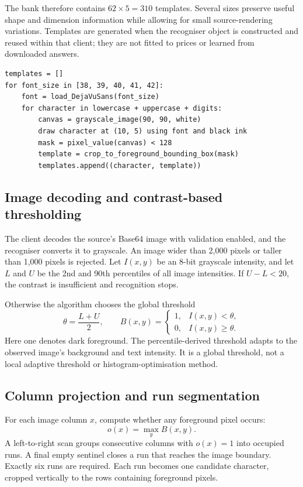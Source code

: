 \documentclass[12pt,a4paper,oneside]{report}
\numberwithin{equation}{chapter}
\numberwithin{figure}{chapter}
\numberwithin{table}{chapter}
\theoremstyle{definition}
\begin{document}
The bank therefore contains $62\times5=310$ templates. Several sizes preserve useful shape and dimension information while allowing for small source-rendering variations. Templates are generated when the recogniser object is constructed and reused within that client; they are not fitted to prices or learned from downloaded answers.

\begin{lstlisting}[caption={Algorithm: generate the CAPTCHA template bank}]
templates = []
for font_size in [38, 39, 40, 41, 42]:
    font = load_DejaVuSans(font_size)
    for character in lowercase + uppercase + digits:
        canvas = grayscale_image(90, 90, white)
        draw character at (10, 5) using font and black ink
        mask = pixel_value(canvas) < 128
        template = crop_to_foreground_bounding_box(mask)
        templates.append((character, template))
\end{lstlisting}

\subsection{Image decoding and contrast-based thresholding}
The client decodes the source's Base64 image with validation enabled, and the recogniser converts it to grayscale. An image wider than 2,000 pixels or taller than 1,000 pixels is rejected. Let $I(x,y)$ be an 8-bit grayscale intensity, and let $L$ and $U$ be the 2nd and 90th percentiles of all image intensities. If $U-L<20$, the contrast is insufficient and recognition stops.

Otherwise the algorithm chooses the global threshold
\[
\theta=\frac{L+U}{2},\qquad
B(x,y)=\begin{cases}1,&I(x,y)<\theta,\\0,&I(x,y)\ge\theta.\end{cases}
\]
Here one denotes dark foreground. The percentile-derived threshold adapts to the observed image's background and text intensity. It is a global threshold, not a local adaptive threshold or histogram-optimisation method.

\subsection{Column projection and run segmentation}
For each image column $x$, compute whether any foreground pixel occurs:
\[
o(x)=\max_y B(x,y).
\]
A left-to-right scan groups consecutive columns with $o(x)=1$ into occupied runs. A final empty sentinel closes a run that reaches the image boundary. Exactly six runs are required. Each run becomes one candidate character, cropped vertically to the rows containing foreground pixels.
\end{document}
